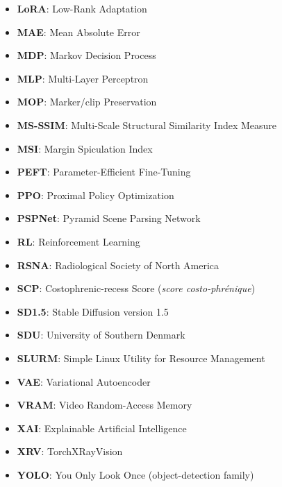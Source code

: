\begin{itemize}[leftmargin=1.4em,itemsep=2pt]
  \item \textbf{LoRA}: Low-Rank Adaptation
  \item \textbf{MAE}: Mean Absolute Error
  \item \textbf{MDP}: Markov Decision Process
  \item \textbf{MLP}: Multi-Layer Perceptron
  \item \textbf{MOP}: Marker/clip Preservation
  \item \textbf{MS-SSIM}: Multi-Scale Structural Similarity Index Measure
  \item \textbf{MSI}: Margin Spiculation Index
  \item \textbf{PEFT}: Parameter-Efficient Fine-Tuning
  \item \textbf{PPO}: Proximal Policy Optimization
  \item \textbf{PSPNet}: Pyramid Scene Parsing Network
  \item \textbf{RL}: Reinforcement Learning
  \item \textbf{RSNA}: Radiological Society of North America
  \item \textbf{SCP}: Costophrenic-recess Score (\textit{score costo-phr\'enique})
  \item \textbf{SD1.5}: Stable Diffusion version 1.5
  \item \textbf{SDU}: University of Southern Denmark
  \item \textbf{SLURM}: Simple Linux Utility for Resource Management
  \item \textbf{VAE}: Variational Autoencoder
  \item \textbf{VRAM}: Video Random-Access Memory
  \item \textbf{XAI}: Explainable Artificial Intelligence
  \item \textbf{XRV}: TorchXRayVision
  \item \textbf{YOLO}: You Only Look Once (object-detection family)
\end{itemize}

\clearpage
